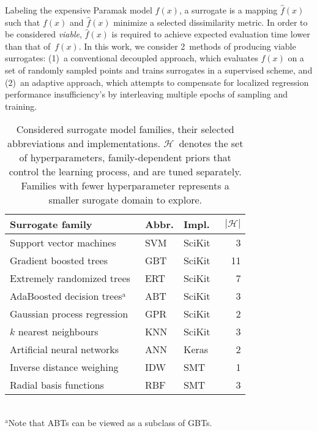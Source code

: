 Labeling the expensive Paramak model $f(x)$, a surrogate is a mapping
$\hat{f}(x)$ such that $f(x)$ and $\hat{f}(x)$ minimize a selected dissimilarity
metric. In order to be considered \textit{viable}, $\hat{f}(x)$ is required to
achieve expected evaluation time lower than that of~$f(x)$. In this work, we
consider 2~methods of producing viable surrogates: (1)~a conventional decoupled
approach, which evaluates $f(x)$ on a set of randomly sampled points and
trains surrogates in a supervised scheme, and (2)~an adaptive approach, which attempts to
compensate for localized regression performance insufficiency's by interleaving
multiple epochs of sampling and training.

\begin{table}[t]
	\setlength\tabcolsep{1pt}
	\renewcommand{\arraystretch}{0.95}
	\caption{\label{tbl:surrogates}Considered surrogate model families, their
		selected abbreviations and implementations. $\mathcal{H}$~denotes the
		set of hyperparameters, family-dependent priors that control the
		learning process, and are tuned separately. Families with fewer
		hyperparameter represents a smaller surogate domain to explore.}
	\begin{indented}
	\item[]
		\begin{tabular}{lllr}
		\toprule
		Surrogate family & Abbr. & Impl. & $|\mathcal{H}|$ \\
		\midrule
		Support vector machines~\cite{fan2008liblinear}	& SVM & SciKit~\cite{scikit-learn} & 3 \\
		Gradient boosted trees~\cite{friedman2001greedy,friedman1999stochastic,hastie2009elements}	& GBT & SciKit & 11 \\
		Extremely randomized trees~\cite{geurts2006extremely}	& ERT & SciKit & 7 \\
		AdaBoosted decision trees$^\text{a}$~\cite{drucker1997improving}	& ABT & SciKit & 3 \\
		Gaussian process regression~\cite{williams2006gaussian}	& GPR & SciKit & 2 \\
		$k$ nearest neighbours	& KNN & SciKit & 3 \\
		Artificial neural networks	& ANN & Keras~\cite{chollet2015keras} & 2 \\
		Inverse distance weighing~\cite{shepard1968two} & IDW & SMT~\cite{SMT2019} & 1 \\
		Radial basis functions & RBF & SMT & 3 \\
		\bottomrule
		\end{tabular}\\%
		{\footnotesize $^\text{a}$Note that ABTs can be viewed as a subclass of GBTs.}
	\end{indented}
\end{table}

